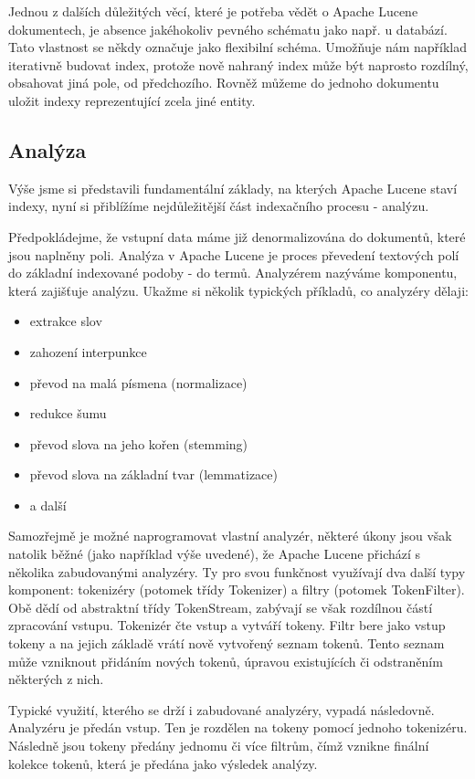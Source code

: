 \documentclass[11pt,draft,oneside]{fithesis2}
\begin{document}
Jednou z dalších důležitých věcí, které je potřeba vědět o Apache Lucene dokumentech, je absence jakéhokoliv pevného schématu jako např. u databází. Tato vlastnost se někdy označuje jako flexibilní schéma. Umožňuje nám například iterativně budovat index, protože nově nahraný index může být naprosto rozdílný, obsahovat jiná pole, od předchozího. Rovněž můžeme do jednoho dokumentu uložit indexy reprezentující zcela jiné entity.

\subsection{Analýza}
Výše jsme si představili fundamentální základy, na kterých Apache Lucene staví indexy, nyní si přiblížíme nejdůležitější část indexačního procesu - analýzu.

Předpokládejme, že vstupní data máme již denormalizována do dokumentů, které jsou naplněny poli. Analýza v Apache Lucene je proces převedení textových polí do základní indexované podoby - do termů. Analyzérem nazýváme komponentu, která zajišťuje analýzu. Ukažme si několik typických příkladů, co analyzéry dělaji:

\begin{itemize}
	\item extrakce slov
	\item zahození interpunkce
	\item převod na malá písmena (normalizace)
	\item redukce šumu
	\item převod slova na jeho kořen (stemming)
	\item převod slova na základní tvar (lemmatizace)
	\item a další 
\end{itemize}

Samozřejmě je možné naprogramovat vlastní analyzér, některé úkony jsou však natolik běžné (jako například výše uvedené), že Apache Lucene přichází s několika zabudovanými analyzéry. Ty pro svou funkčnost využívají dva další typy komponent: tokenizéry (potomek třídy Tokenizer) a filtry (potomek TokenFilter). Obě dědí od abstraktní třídy TokenStream, zabývají se však rozdílnou částí zpracování vstupu. Tokenizér čte vstup a vytváří tokeny. Filtr bere jako vstup tokeny a na jejich základě vrátí nově vytvořený seznam tokenů. Tento seznam může vzniknout přidáním nových tokenů, úpravou existujících či odstraněním některých z nich. 

Typické využití, kterého se drží i zabudované analyzéry, vypadá následovně. Analyzéru je předán vstup. Ten je rozdělen na tokeny pomocí jednoho tokenizéru. Následně jsou tokeny předány jednomu či více filtrům, čímž vznikne finální kolekce tokenů, která je předána jako výsledek analýzy.
\end{document}
